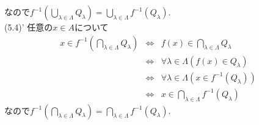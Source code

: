 \documentclass{jsarticle}
\begin{document}
なので$f^{-1}\left(\bigcup_{\lambda \in \Lambda}Q_\lambda\right) = \bigcup_{\lambda \in \Lambda}f^{-1}(Q_\lambda)$.\\
(5.4)' 任意の$x \in A$について
\begin{eqnarray*}
	x \in f^{-1}\left(\bigcap_{\lambda \in \Lambda}Q_\lambda\right)
	&\Leftrightarrow& f(x) \in \bigcap_{\lambda \in \Lambda}Q_\lambda\\
	&\Leftrightarrow& \forall{\lambda \in \Lambda}(f(x) \in Q_\lambda)\\
	&\Leftrightarrow& \forall{\lambda \in \Lambda}(x \in f^{-1}(Q_\lambda))\\
	&\Leftrightarrow& x \in \bigcap_{\lambda \in \Lambda}f^{-1}(Q_\lambda)
\end{eqnarray*}
なので$f^{-1}\left(\bigcap_{\lambda \in \Lambda}Q_\lambda\right) = \bigcap_{\lambda \in \Lambda}f^{-1}(Q_\lambda)$.
\end{document}
